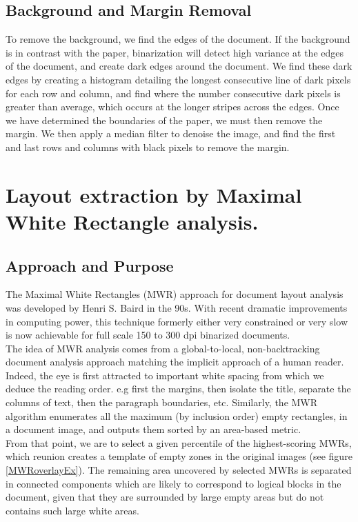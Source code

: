 \documentclass{report}
\begin{document}
\section{Background and Margin Removal}
To remove the background, we find the edges of the document. If the background is in contrast with the paper, binarization will detect high variance at the edges of the document, and create dark edges around the document. We find these dark edges by creating a histogram detailing the longest consecutive line of dark pixels for each row and column, and find where the number consecutive dark pixels is greater than average, which occurs at the longer stripes across the edges. Once we have determined the boundaries of the paper, we must then remove the margin. We then apply a median filter to denoise the image, and find the first and last rows and columns with black pixels to remove the margin.



\chapter{Layout extraction by Maximal White Rectangle analysis.}

\section{Approach and Purpose}
The Maximal White Rectangles (MWR) approach for document layout analysis was developed by Henri S. Baird in the 90s. With recent dramatic
improvements in computing power, this technique formerly either very constrained or very slow is now achievable for full scale 150 to
300 dpi binarized documents.\\

The idea of MWR analysis comes from a global-to-local, non-backtracking document analysis approach matching the implicit approach of a human
reader. Indeed, the eye is first attracted to important white spacing from which we deduce the reading order. e.g first the margins, then isolate
the title, separate the columns of text, then the paragraph boundaries, etc. Similarly, the MWR algorithm enumerates all the maximum (by inclusion
order) empty rectangles, in a document image, and outputs them sorted by an area-based metric.\\

From that point, we are to select a given percentile of the highest-scoring MWRs, which reunion creates a template of empty zones in the original
images (see figure \ref{MWRoverlayEx}). The remaining area uncovered by selected MWRs is separated in connected components which are likely
to correspond to logical blocks in the document, given that they are surrounded by large empty areas but do not contains such large white areas.\\
\end{document}
